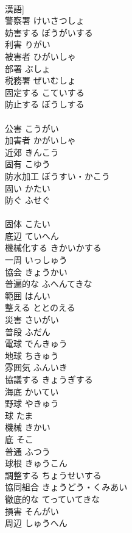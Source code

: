 \documentclass[8pt]{extreport}
\begin{document}
\begin{CJK}{UTF8}{min}
\\	漢語]
\\	警察署	けいさつしょ	
\\	妨害する	ぼうがいする	
\\	利害	りがい	
\\	被害者	ひがいしゃ	
\\	部署	ぶしょ	
\\	税務署	ぜいむしょ	
\\	固定する	こていする	
\\	防止する	ぼうしする	
\\	[漢語]
\\	公害	こうがい	
\\	加害者	かがいしゃ	
\\	近郊	きんこう	
\\	固有	こゆう	
\\	防水加工	ぼうすい・かこう	
\\	固い	かたい	
\\	防ぐ	ふせぐ	
\\	[和語]
\\	固体	こたい	
\\	底辺	ていへん	
\\	機械化する	きかいかする	
\\	一周	いっしゅう	
\\	協会	きょうかい	
\\	普遍的な	ふへんてきな	
\\	範囲	はんい	
\\	整える	ととのえる	
\\	災害	さいがい	
\\	普段	ふだん	
\\	電球	でんきゅう	
\\	地球	ちきゅう	
\\	雰囲気	ふんいき	
\\	協議する	きょうぎする	
\\	海底	かいてい	
\\	野球	やきゅう	
\\	球	たま	
\\	機械	きかい	
\\	底	そこ	
\\	普通	ふつう	
\\	球根	きゅうこん	
\\	調整する	ちょうせいする	
\\	協同組合	きょうどう・くみあい	
\\	徹底的な	てっていてきな	
\\	損害	そんがい	
\\	周辺	しゅうへん	

\end{CJK}
\end{document}
